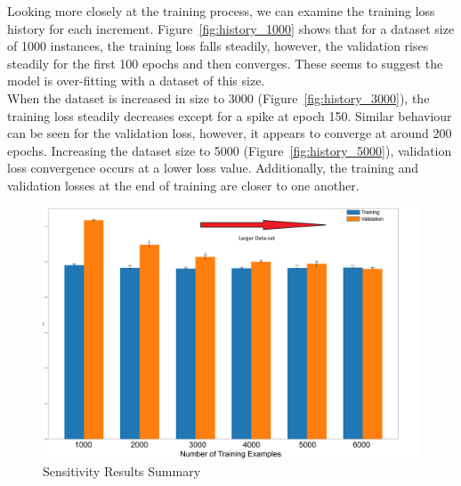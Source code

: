 \noindent Looking more closely at the training process, we can examine the training loss history for each increment. Figure~\ref{fig:history_1000} shows that for a dataset size of 1000 instances, the training loss falls steadily, however, the validation rises steadily for the first 100 epochs and then converges. These seems to suggest the model is over-fitting with a dataset of this size. \\

\noindent When the dataset is increased in size to 3000 (Figure~\ref{fig:history_3000}), the training loss steadily decreases except for a spike at epoch 150. Similar behaviour can be seen for the validation loss, however, it appears to converge at around 200 epochs. Increasing the dataset size to 5000 (Figure~\ref{fig:history_5000}), validation loss convergence occurs at a lower loss value. Additionally, the training and validation losses at the end of training are closer to one another.
\\

\begin{figure}[b]
	\centering
	\includegraphics[scale=0.14]{Figures/comparing_models_Sensitivity.png}
	\caption{Sensitivity Results Summary}
	\label{fig:sensitivity_summary}
\end{figure}

